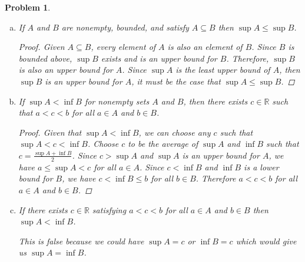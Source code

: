 \documentclass[12pt]{article}
\newtheorem{problem}{Problem}
\newcommand{\RR}{\ensuremath{\mathbb R}}
\begin{document}
\begin{problem} %


\begin{enumerate}[(a)]
\item If $A$ and $B$ are nonempty, bounded, and satisfy $A\subseteq B$
then $\sup A\le \sup B$.

 \begin{proof} Given $A \subseteq B$, every element of $A$ is also an element of $B$. Since $B$ is bounded above, $\sup B$ exists and is an upper bound for $B$. Therefore, $\sup B$ is also an upper bound for $A$. \newline
Since $\sup A$ is the least upper bound of $A$, then $\sup B$ is an upper bound for $A$, it must be the case that $\sup A \leq \sup B$.\end{proof}

\item If $\sup A< \inf B$ for nonempty sets $A$ and $B$, then there exists
$c\in\RR$ such that $a<c<b$ for all $a\in A$ and $b\in B$.

\begin{proof} Given that $\sup A < \inf B$, we can choose any $c$ such that $\sup A < c < \inf B$. Choose $c$ to be the average of $\sup A$ and $\inf B$ such that $c = \frac{\sup A + \inf B}{2}$.
\newline \newline
Since $c > \sup A$ and $\sup A$ is an upper bound for $A$, we have $a \leq \sup A < c$ for all $a \in A$. \newline 
Since $c < \inf B$ and $\inf B$ is a lower bound for $B$, we have $c < \inf B \leq b$ for all $b \in B$. \newline \newline 
Therefore $a < c < b$ for all $a \in A$ and $b \in B$.
\end{proof}

\item If there exists $c\in\RR$ satisfying $a<c<b$ for all
$a\in A$ and $b\in B$ then $\sup A< \inf B$. 

 \bigskip This is false because we could have $\sup A = c$ or $\inf B = c$ which would give us $\sup A = \inf B$.

\end{enumerate}
\end{problem}
\end{document}
